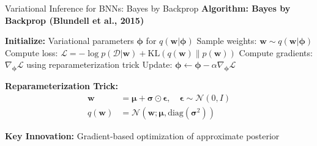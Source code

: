 \documentclass[aspectratio=169,11pt]{beamer}
\newcommand{\KL}{\text{KL}}
\newcommand{\Normal}{\mathcal{N}}
\newcommand{\bw}{\mathbf{w}}
\newcommand{\bmu}{\boldsymbol{\mu}}
\begin{document}
\begin{frame}{Variational Inference for BNNs: Bayes by Backprop}
\textbf{Algorithm: Bayes by Backprop (Blundell et al., 2015)}

\begin{algorithm}[H]
\caption{Variational Inference for BNN}
\begin{algorithmic}[1]
\STATE \textbf{Initialize:} Variational parameters $\boldsymbol{\phi}$ for $q(\bw|\boldsymbol{\phi})$
\STATE Sample weights: $\bw \sim q(\bw|\boldsymbol{\phi})$
\STATE Compute loss: $\mathcal{L} = -\log p(\mathcal{D}|\bw) + \KL(q(\bw) \| p(\bw))$
\STATE Compute gradients: $\nabla_{\boldsymbol{\phi}} \mathcal{L}$ using reparameterization trick
\STATE Update: $\boldsymbol{\phi} \leftarrow \boldsymbol{\phi} - \alpha \nabla_{\boldsymbol{\phi}} \mathcal{L}$
\ENDFOR
\end{algorithmic}
\end{algorithm}

\textbf{Reparameterization Trick:}
\begin{align}
\bw &= \bmu + \boldsymbol{\sigma} \odot \boldsymbol{\epsilon}, \quad \boldsymbol{\epsilon} \sim \Normal(0, I)\\
q(\bw) &= \Normal(\bw; \bmu, \text{diag}(\boldsymbol{\sigma}^2))
\end{align}

\textbf{Key Innovation:} Gradient-based optimization of approximate posterior
\end{frame}
\end{document}
